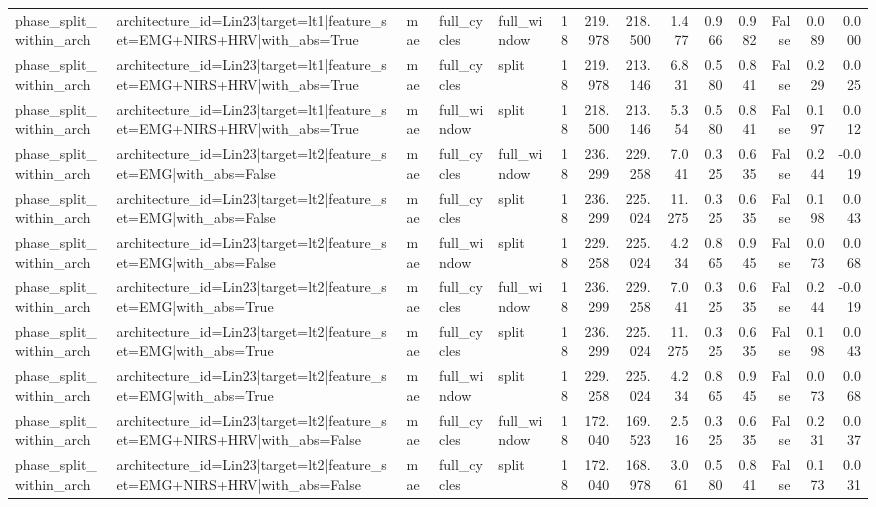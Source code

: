 \begin{table}
\begin{tabular}{lllllrrrrrrrrr}
phase_split_within_arch & architecture_id=Lin23|target=lt1|feature_set=EMG+NIRS+HRV|with_abs=True & mae & full_cycles & full_window & 18 & 219.978 & 218.500 & 1.477 & 0.966 & 0.982 & False & 0.089 & 0.000 \\
phase_split_within_arch & architecture_id=Lin23|target=lt1|feature_set=EMG+NIRS+HRV|with_abs=True & mae & full_cycles & split & 18 & 219.978 & 213.146 & 6.831 & 0.580 & 0.841 & False & 0.229 & 0.025 \\
phase_split_within_arch & architecture_id=Lin23|target=lt1|feature_set=EMG+NIRS+HRV|with_abs=True & mae & full_window & split & 18 & 218.500 & 213.146 & 5.354 & 0.580 & 0.841 & False & 0.197 & 0.012 \\
phase_split_within_arch & architecture_id=Lin23|target=lt2|feature_set=EMG|with_abs=False & mae & full_cycles & full_window & 18 & 236.299 & 229.258 & 7.041 & 0.325 & 0.635 & False & 0.244 & -0.019 \\
phase_split_within_arch & architecture_id=Lin23|target=lt2|feature_set=EMG|with_abs=False & mae & full_cycles & split & 18 & 236.299 & 225.024 & 11.275 & 0.325 & 0.635 & False & 0.198 & 0.043 \\
phase_split_within_arch & architecture_id=Lin23|target=lt2|feature_set=EMG|with_abs=False & mae & full_window & split & 18 & 229.258 & 225.024 & 4.234 & 0.865 & 0.945 & False & 0.073 & 0.068 \\
phase_split_within_arch & architecture_id=Lin23|target=lt2|feature_set=EMG|with_abs=True & mae & full_cycles & full_window & 18 & 236.299 & 229.258 & 7.041 & 0.325 & 0.635 & False & 0.244 & -0.019 \\
phase_split_within_arch & architecture_id=Lin23|target=lt2|feature_set=EMG|with_abs=True & mae & full_cycles & split & 18 & 236.299 & 225.024 & 11.275 & 0.325 & 0.635 & False & 0.198 & 0.043 \\
phase_split_within_arch & architecture_id=Lin23|target=lt2|feature_set=EMG|with_abs=True & mae & full_window & split & 18 & 229.258 & 225.024 & 4.234 & 0.865 & 0.945 & False & 0.073 & 0.068 \\
phase_split_within_arch & architecture_id=Lin23|target=lt2|feature_set=EMG+NIRS+HRV|with_abs=False & mae & full_cycles & full_window & 18 & 172.040 & 169.523 & 2.516 & 0.325 & 0.635 & False & 0.231 & 0.037 \\
phase_split_within_arch & architecture_id=Lin23|target=lt2|feature_set=EMG+NIRS+HRV|with_abs=False & mae & full_cycles & split & 18 & 172.040 & 168.978 & 3.061 & 0.580 & 0.841 & False & 0.173 & 0.031 \\

\end{tabular}
\end{table}
